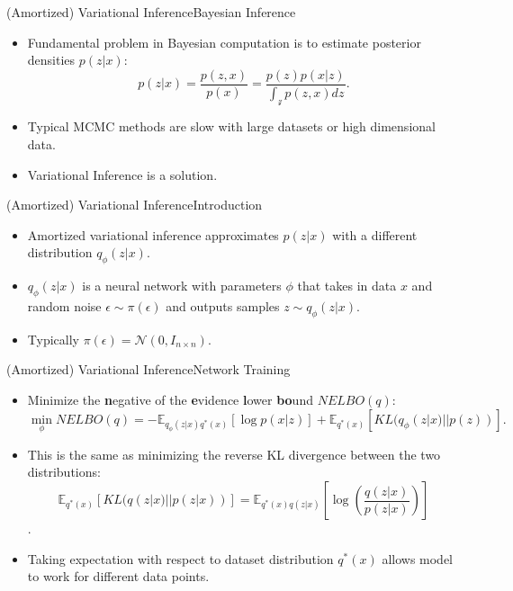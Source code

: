 \documentclass{beamer}
\newcommand{\E}{\mathbb{E}}
\begin{document}
\begin{frame}{(Amortized) Variational Inference}{Bayesian Inference}
  \begin{itemize}
  \item {
    Fundamental problem in Bayesian computation is to estimate posterior densities $p(z|x)$:
  }
  \begin{equation*}
p(z|x)=\frac{p(z,x)}{p(x)}= \frac{p(z)p(x|z)}{\int_\mathcal{z}p(z,x)dz}.
\end{equation*}
  \item {
    Typical MCMC methods are slow with large datasets or high dimensional data.
  }
  \item {
    Variational Inference is a solution.
  }
  \end{itemize}
\end{frame}
\begin{frame}{(Amortized) Variational Inference}{Introduction}
\begin{itemize}
\item Amortized variational inference approximates $p(z|x)$ with a different distribution $q_\phi(z|x)$.
\item $q_\phi(z|x)$ is a neural network with parameters $\phi$ that takes in data $x$ and random noise $\epsilon\sim \pi(\epsilon)$ and outputs samples $z\sim q_\phi(z|x)$.
\item Typically $\pi(\epsilon)=\mathcal{N}(0,I_{n\times n})$.
\begin{figure}[h]
  \centering
\end{figure}
\end{itemize}
\end{frame}
\begin{frame}{(Amortized) Variational Inference}{Network Training}
\begin{itemize}
\item Minimize the \textbf{n}egative of the \textbf{e}vidence \textbf{l}ower \textbf{bo}und $NELBO(q)$:
\[\min_\phi NELBO(q)=-\mathbb{E}_{q_\phi(z|x)q^*(x)}[\log p(x|z)]+\mathbb{E}_{q^*(x)}[KL(q_\phi(z|x)||p(z))].\]
\item This is the same as minimizing the reverse KL divergence between the two distributions:
\[\E_{q^*(x)}[KL(q(z|x)||p(z|x))]=\mathbb{E}_{q^*(x)q(z|x)}\left[\log \left(\frac{q(z|x)}{p(z|x)}\right)\right]\].
\item Taking expectation with respect to dataset distribution $q^*(x)$ allows model to work for different data points.
\end{itemize}
\end{frame}
\end{document}
